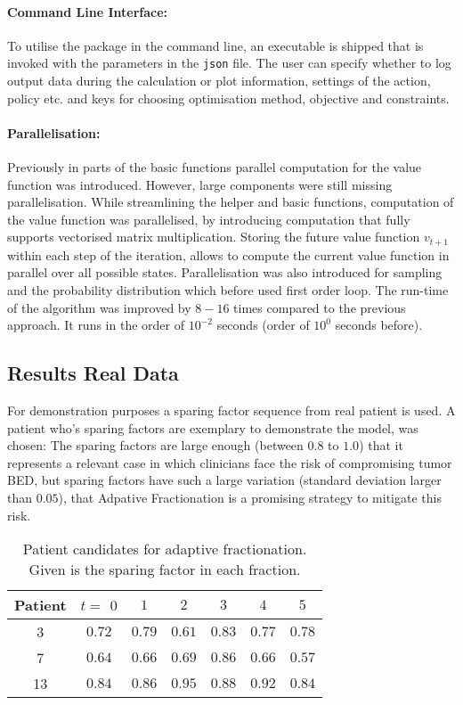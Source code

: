 \documentclass[\relativeRoot/ada.tex]{subfiles}
\begin{document}
\paragraph{Command Line Interface:} To utilise the package in the command line, an executable is shipped that is invoked with the parameters in the \texttt{json} file. The user can specify whether to log output data during the calculation or plot information, settings of the action, policy etc. and keys for choosing optimisation method, objective  and constraints.

\paragraph{Parallelisation:} Previously in parts of the basic functions parallel computation for the value function was introduced. However, large components were still missing parallelisation. While streamlining the helper and basic functions, computation of the value function was parallelised, by introducing computation that fully supports vectorised matrix multiplication. Storing the future value function $v_{t+1}$ within each step of the iteration, allows to compute the current value function in parallel over all possible states. Parallelisation was also introduced for sampling and the probability distribution which before used first order loop. The run-time of the algorithm was improved by $8-16$ times compared to the previous approach. It runs in the order of $10^{-2}$ seconds (order of $10^{0}$ seconds before).

\subsection{Results Real Data}

For demonstration purposes a sparing factor sequence from real patient is used. A patient who's sparing factors are exemplary to demonstrate the model, was chosen: The sparing factors are large enough (between $0.8$ to $1.0$) that it represents a relevant case in which clinicians face the risk of compromising tumor BED, but sparing factors have such a large variation (standard deviation larger than $0.05$), that Adpative Fractionation is a promising strategy to mitigate this risk. 

\begin{table}[!htb]
    \centering
    \caption{Patient candidates for adaptive fractionation. Given is the sparing factor in each fraction.}
    \begin{tabular}{c|cccccc}
    \toprule
        Patient & $t=$ $0$ & $1$ & $2$ & $3$ & $4$ & $5$\\
    \midrule
       3    &  $0.72$ & $0.79$ &  $0.61$ & $0.83$ & $0.77$ & $0.78$\\
       7    &  $0.64$ & $0.66$ &  $0.69$ & $0.86$ & $0.66$ & $0.57$ \\
       13   &  $0.84$ & $0.86$ &  $0.95$ & $0.88$ & $0.92$ & $0.84$ \\
     
    \bottomrule
    \end{tabular}
    \label{tab:pancreas_sparing_factors}
\end{table}
\end{document}

